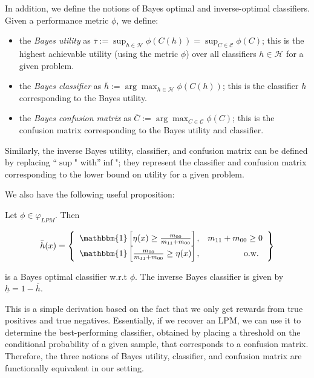 \documentclass[
  letterpaper,
  numbers=noenddot,
  DIV=11,
  oneside]{scrreprt}
\theoremstyle{remark}
\begin{document}
In addition, we define the notions of Bayes optimal and inverse-optimal
classifiers. Given a performance metric \(\phi\), we define:

\begin{itemize}
\item
  the \emph{Bayes utility} as
  \(\bar{\tau} := \sup_{h \in \mathcal{H}} \phi(C(h)) = \sup_{C \in \mathcal{C}} \phi(C)\); this is the highest achievable
  utility (using the metric \(\phi\)) over all classifiers
  \(h \in \mathcal{H}\) for a given problem.
\item
  the \emph{Bayes classifier} as
  \(\bar{h} := \arg \max_{h \in \mathcal{H}} \phi(C(h))\); this is the
  classifier \(h\) corresponding to the Bayes utility.
\item
  the \emph{Bayes confusion matrix} as
  \(\bar{C} := \arg \max_{C \in \mathcal{C}} \phi(C)\); this is the
  confusion matrix corresponding to the Bayes utility and classifier.
\end{itemize}

Similarly, the inverse Bayes utility, classifier, and confusion matrix
can be defined by replacing ``\(\sup\)" with''\(\inf\)"; they represent
the classifier and confusion matrix corresponding to the lower bound on
utility for a given problem.

We also have the following useful proposition:

Let \(\phi \in \varphi_{L P M}\). Then

\[\bar{h}(x)=\left\{\begin{array}{lr}
\mathbbm{1}\left[\eta(x) \geq \frac{m_{00}}{m_{11}+m_{00}}\right], & m_{11}+m_{00} \geq 0 \\
\mathbbm{1}\left[\frac{m_{00}}{m_{11}+m_{00}} \geq \eta(x)\right], & \text { o.w. }
\end{array}\right\}\]

is a Bayes optimal classifier w.r.t \(\phi\). The inverse Bayes
classifier is given by \(\underline{h}=1-\bar{h}\).

This is a simple derivation based on the fact that we only get rewards
from true positives and true negatives. Essentially, if we recover an
LPM, we can use it to determine the best-performing classifier, obtained
by placing a threshold on the conditional probability of a given sample,
that corresponds to a confusion matrix. Therefore, the three notions of
Bayes utility, classifier, and confusion matrix are functionally
equivalent in our setting.
\end{document}

